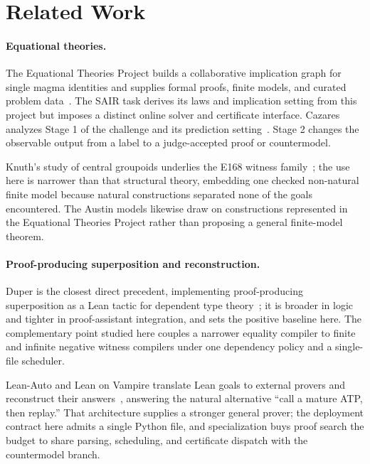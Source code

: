 \documentclass[10pt,twocolumn]{article}
\begin{document}
\section{Related Work}
\label{sec:rw}

\paragraph{Equational theories.}
The Equational Theories Project builds a collaborative implication graph for
single magma identities and supplies formal proofs, finite models, and curated
problem data~\cite{etp}.  The SAIR task derives its laws and implication
setting from this project but imposes a distinct online solver and certificate
interface.  Cazares analyzes Stage 1 of the challenge and its prediction
setting~\cite{cazaresStage1}.  Stage 2 changes the observable output from a
label to a judge-accepted proof or countermodel.

Knuth's study of central groupoids underlies the E168 witness
family~\cite{knuthCentral}; the use here is narrower than that structural
theory, embedding one checked non-natural finite model because natural
constructions separated none of the goals encountered.  The Austin models
likewise draw on constructions represented in the Equational Theories Project
rather than proposing a general finite-model theorem.

\paragraph{Proof-producing superposition and reconstruction.}
Duper is the closest direct precedent, implementing proof-producing
superposition as a Lean tactic for dependent type theory~\cite{duper}; it is
broader in logic and tighter in proof-assistant integration, and sets the
positive baseline here.  The complementary point studied here couples a
narrower equality compiler to finite and infinite negative witness compilers
under one dependency policy and a single-file scheduler.

Lean-Auto and Lean on Vampire translate Lean goals to external provers and
reconstruct their answers~\cite{leanAuto,leanVampire}, answering the natural
alternative ``call a mature ATP, then replay.''  That architecture supplies a
stronger general prover; the deployment contract here admits a single Python
file, and specialization buys proof search the budget to share parsing,
scheduling, and certificate dispatch with the countermodel branch.
\end{document}
